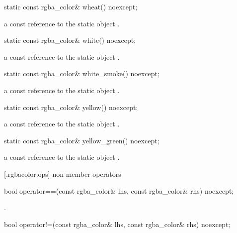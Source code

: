 \begin{itemdecl}
static const rgba_color& wheat() noexcept;
\end{itemdecl}
\begin{itemdescr}
\pnum
\returns
a const reference to the static  object .
\end{itemdescr}

\begin{itemdecl}
static const rgba_color& white() noexcept;
\end{itemdecl}
\begin{itemdescr}
\pnum
\returns
a const reference to the static  object .
\end{itemdescr}

\begin{itemdecl}
static const rgba_color& white_smoke() noexcept;
\end{itemdecl}
\begin{itemdescr}
\pnum
\returns
a const reference to the static  object .
\end{itemdescr}

\begin{itemdecl}
static const rgba_color& yellow() noexcept;
\end{itemdecl}
\begin{itemdescr}
\pnum
\returns
a const reference to the static  object .
\end{itemdescr}

\begin{itemdecl}
static const rgba_color& yellow_green() noexcept;
\end{itemdecl}
\begin{itemdescr}
\pnum
\returns
a const reference to the static  object .
\end{itemdescr}

 [\iotwod.rgbacolor.ops] { non-member operators}

\begin{itemdecl}
bool operator==(const rgba_color& lhs, const rgba_color& rhs) noexcept;
\end{itemdecl}
\begin{itemdescr}
\pnum
\returns
{}.
\end{itemdescr}

\begin{itemdecl}
bool operator!=(const rgba_color& lhs, const rgba_color& rhs) noexcept;
\end{itemdecl}
\begin{itemdescr}
\pnum
\returns
{}
\end{itemdescr}
